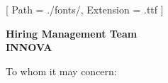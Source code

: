 


\renewcommand{\photo}[2]{}

\geometry{
  left=2cm,
  right=2cm,
  top=2cm,
  bottom=2cm
}



\makecvheader

\setmainfont{NotoSans-Regular}[
  Path = ./fonts/,
  Extension = .ttf
]

\vspace{1cm}
\indent\textbf{Hiring Management Team}\\
\indent\textbf{INNOVA}

\vspace{0.5cm}

\noindent To whom it may concern:

\vspace{0.5cm}

